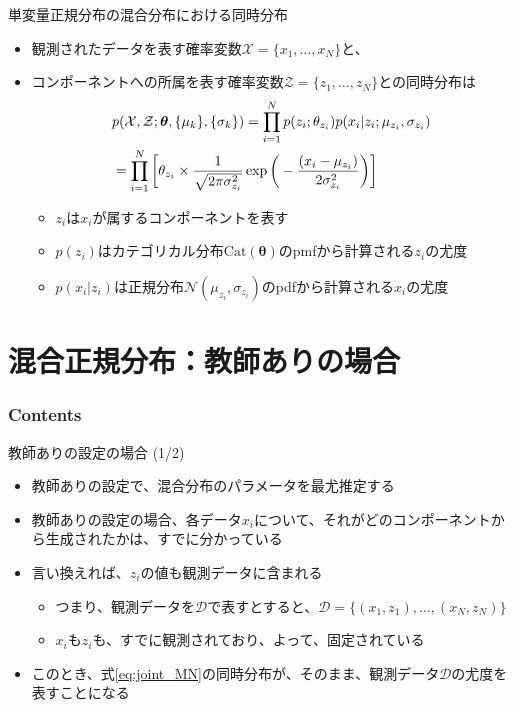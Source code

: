 \documentclass[aspectratio=169,unicode,dvipdfmx,14pt]{beamer}
\begin{document}
\begin{frame}{単変量正規分布の混合分布における同時分布}
\vspace{-.1in}
\begin{itemize}
\item 観測されたデータを表す確率変数$\mathcal{X} = \{x_1, \ldots, x_N\}$と、
\item[] コンポーネントへの所属を表す確率変数$\mathcal{Z} = \{z_1,\ldots,z_N\}$との同時分布は
\vspace{-.1in}
\begin{align}
& p( \mathcal{X}, \mathcal{Z} ;\bm{\theta}, \{ \mu_k \}, \{ \sigma_k \})
= \prod_{i=1}^N p(z_i ; \theta_{z_i}) p(x_i | z_i ; \mu_{z_i}, \sigma_{z_i})
\notag \\ &
= \prod_{i=1}^N \bigg[ \theta_{z_i} \times \frac{1}{\sqrt{2\pi\sigma_{z_i}^2}}\exp\bigg( - \frac{(x_i - \mu_{z_i})}{2\sigma_{z_i}^2} \bigg) \bigg]
\label{eq:joint_MN}
\end{align}
\vspace{-.15in}
\begin{itemize}
\item $z_i$は$x_i$が属するコンポーネントを表す
\item $p(z_i)$はカテゴリカル分布$\mbox{Cat}(\bm{\theta})$のpmfから計算される$z_i$の尤度
\item $p(x_i | z_i)$は正規分布$\mathcal{N}(\mu_{z_i}, \sigma_{z_i})$のpdfから計算される$x_i$の尤度
\end{itemize}
\end{itemize}
\end{frame}


\section{混合正規分布：教師ありの場合}

\begin{frame}\frametitle{Contents}
\Large \tableofcontents[currentsection]
\end{frame}


\begin{frame}{教師ありの設定の場合 (1/2)}
\begin{itemize}
\item 教師ありの設定で、混合分布のパラメータを最尤推定する
\item 教師ありの設定の場合、各データ$x_i$について、それがどのコンポーネントから生成されたかは、すでに分かっている
\item 言い換えれば、$z_i$の値も観測データに含まれる
\begin{itemize}
\item つまり、観測データを$\mathcal{D}$で表すとすると、$\mathcal{D} = \{ (x_1,z_1), \ldots, (x_N,z_N) \}$
\item $x_i$も$z_i$も、すでに観測されており、よって、固定されている
\end{itemize}
\item このとき、式\eqref{eq:joint_MN}の同時分布が、そのまま、観測データ$\mathcal{D}$の尤度を表すことになる
\end{itemize}
\end{frame}
\end{document}
